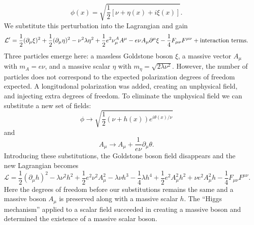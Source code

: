 \begin{equation}
\phi(x) =\sqrt{\frac{1}{2}[\nu+\eta(x)+i\xi(x)]}.
\end{equation}
We substitute this perturbation into the Lagrangian and gain
\begin{equation}
\mathcal{L}'=\frac{1}{2}(\partial_\mu\xi)^2+\frac{1}{2}(\partial_\mu\eta)^2-\nu^2\lambda\eta^2+\frac{1}{2}e^2\nu^A_\mu A^\mu-e\nu A_\mu \partial^\mu\xi-\frac{1}{4}F_{\mu\nu}F^{\mu\nu} + \textnormal{interaction terms}.
\end{equation}
Three particles emerge here: a massless Goldstone boson $\xi$, a massive vector $A_\mu$ with $m_A=e\nu$, and a massive scalar $\eta$ with $m_\eta=\sqrt{2\lambda\nu^2}$. However, the number of particles does not correspond to the expected polarization degrees of freedom expected. A longitudonal polarization was added, creating an unphysical field, and injecting extra degrees of freedom. To eliminate the unphysical field we can substitute a new set of fields:
\begin{equation}
\phi \rightarrow \sqrt{\frac{1}{2}(\nu+h(x))e^{i\theta(x)/\nu}}
\end{equation}
and 
\begin{equation}
A_\mu \rightarrow A_\mu + \frac{1}{e\nu} \partial_\mu\theta.
\end{equation}
Introducing these substitutions, the Goldstone boson field disappears and the new Lagrangian becomes 
\begin{equation}
\mathcal{L} = \frac{1}{2}(\partial_\mu h)^2 -\lambda\nu^2h^2+\frac{1}{2}e^2\nu^2A_\mu^2-\lambda\nu h^3-\frac{1}{4}\lambda h^4+\frac{1}{2}e^2A_\mu^2h^2+\nu e^2A_\mu^2h-\frac{1}{4}F_{\mu\nu}F^{\mu\nu}.
\end{equation}
Here the degrees of freedom before our substitutions remains the same and a massive boson $A_\mu$ is preserved along with a massive scalar $h$. The ``Higgs mechanism'' applied to a scalar field succeeded in creating a massive boson and determined the existence of a massive scalar boson. 

